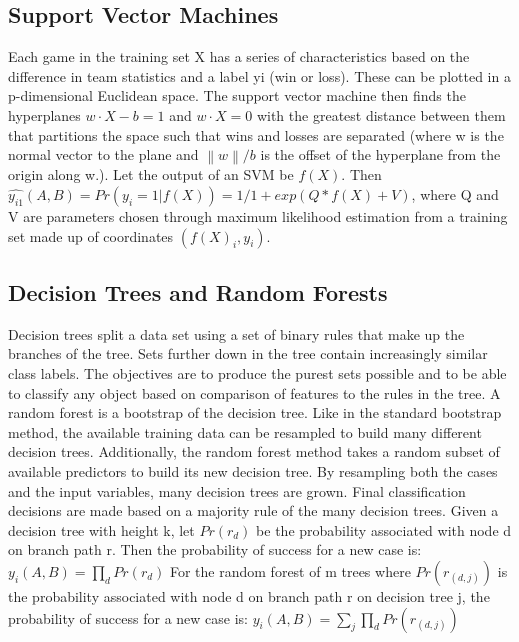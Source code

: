 \documentclass{article}
\begin{document}
\begin{multicols}{2}
	\subsection{Support Vector Machines}
	Each game in the training set X has a series of characteristics based on the difference in team statistics and a label yi (win or loss). These can be plotted in a p-dimensional Euclidean space. The support vector machine then finds the hyperplanes $w·X-b = 1$ and $w ·X = 0$ with the greatest distance between them that partitions the space such that wins and losses are separated (where w is the normal vector to the plane and $\left \| w \right \|/b$ is the offset of the hyperplane from the origin along w.)\cite{4}. Let the output of an SVM be $f(X)$. Then
	\linebreak
	\linebreak
$\hat{y_{i1}}(A,B)  = Pr(y_i = 1| f(X)) = 1/ 1+exp(Q * f(X) +V)$,
	\linebreak
	\linebreak
where Q and V are parameters chosen through maximum likelihood estimation from a training set made up of coordinates $(f(X)_i, y_i)$.\cite{4}

	\subsection{Decision Trees and Random Forests}
	Decision trees split a data set using a set of binary rules that make up the branches of the tree. Sets further down in the tree contain increasingly similar class labels. The objectives are to produce the purest sets possible and to be able to classify any object based on comparison of features to the rules in the tree. A random forest is a bootstrap of the decision tree. Like in the standard bootstrap method, the available training data can be resampled to build many different decision trees. Additionally, the random forest method takes a random subset of available predictors to build its new decision tree. By resampling both the cases and the input
variables, many decision trees are grown. Final classification decisions are made based on a majority rule of the many decision trees. Given a decision tree with height k, let $Pr(r_d)$ be the probability associated with node d on branch path r. Then the probability of success for a new case is:
	$y_i(A,B)=\prod_{d} Pr(r_d)$
	\linebreak
	\linebreak
For the random forest of m trees where $Pr(r_{(d, j)}
)$ is the probability associated with node
d on branch path r on decision tree j, the probability of success for a new case is:
	$y_i(A,B)=\sum_{j}\prod_{d} Pr(r_{(d,j)})$

\end{multicols}
\end{document}
